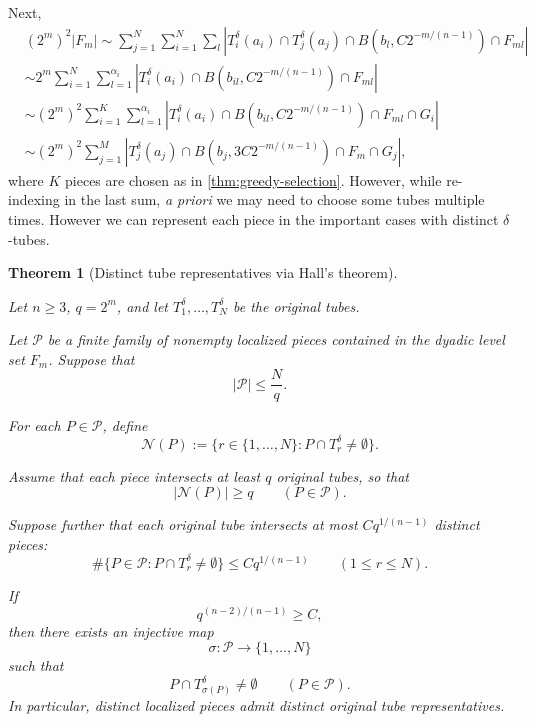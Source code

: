\documentclass[11pt, letterpaper]{nyjm}
\newtheorem{theorem}{Theorem}[section]
\begin{document}
Next,
\begin{equation} \label{eq:final3}
	\begin{aligned}	
		&(2^m)^2|F_m| \sim \sum_{j=1}^{N}\sum_{i=1}^{N}\sum_{l}|T^\delta_i(a_i) \cap T^\delta_j(a_j)\cap B(b_{l},C2^{-m/(n-1)}) \cap F_{ml}| \\ 
		&\sim 2^m\sum_{i=1}^{N}\sum_{l=1}^{\alpha_i}|T^\delta_i(a_i) \cap B(b_{il},C2^{-m/(n-1)}) \cap F_{ml}| \\
		&\sim (2^m)^2\sum_{i=1}^{K}\sum_{l=1}^{\alpha_i}|T^\delta_i(a_i) \cap B(b_{il},C2^{-m/(n-1)}) \cap F_{ml} \cap G_i| \\
		&\sim  (2^{m})^2\sum_{j=1}^{M}|T^\delta_j(a_j) \cap B(b_{j},3C2^{-m/(n-1)}) \cap F_m \cap G_j|,		
	\end{aligned}
\end{equation}
where $K$ pieces are chosen as in \ref{thm:greedy-selection}. However, while  re-indexing in the last sum, \emph{a priori} we may need to choose some tubes multiple times.
However we can represent each piece in the important cases with distinct $\delta$-tubes. 
\begin{theorem}[Distinct tube representatives via Hall's theorem]
	\label{thm:hall-representatives}
	
	Let $n\ge 3$, $q=2^m$, and let
	$T_1^\delta,\ldots,T_N^\delta$ be the original tubes.
	
	Let $\mathcal P$ be a finite family of nonempty
	localized pieces contained in the dyadic level set $F_m$.
	Suppose that
	\[
	|\mathcal P|\le \frac{N}{q}.
	\]
	
	For each $P\in\mathcal P$, define
	\[
	\mathcal N(P)
	:=
	\{r\in\{1,\ldots,N\}:
	P\cap T_r^\delta\neq\emptyset\}.
	\]
	
	Assume that each piece intersects at least $q$ original
	tubes, so that
	\[
	|\mathcal N(P)|\ge q
	\qquad(P\in\mathcal P).
	\]
	
	Suppose further that each original tube intersects
	at most $Cq^{1/(n-1)}$ distinct pieces:
	\[
	\#\{P\in\mathcal P:
	P\cap T_r^\delta\neq\emptyset\}
	\le Cq^{1/(n-1)}
	\qquad(1\le r\le N).
	\]
	
	If
	\[
	q^{(n-2)/(n-1)}\ge C,
	\]
	then there exists an injective map
	\[
	\sigma:\mathcal P\longrightarrow\{1,\ldots,N\}
	\]
	such that
	\[
	P\cap T_{\sigma(P)}^\delta\neq\emptyset
	\qquad(P\in\mathcal P).
	\]
	In particular, distinct localized pieces admit
	distinct original tube representatives.
\end{theorem}
\end{document}
